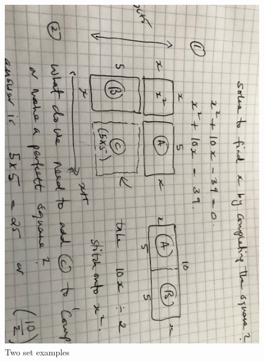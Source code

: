 \begin{figure}[h]
    \centering
    \includegraphics[width=1.25\textwidth]{IMG_3050}
    \caption{Two set examples}
    \label{fig:example1}
\end{figure}
